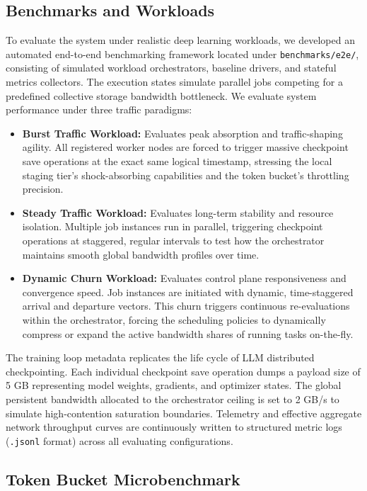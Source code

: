 \documentclass[sigplan,twocolumn,10pt,nonacm]{acmart}
\begin{document}
\subsection{Benchmarks and Workloads}

To evaluate the system under realistic deep learning workloads, we developed an automated end-to-end benchmarking framework located under \texttt{benchmarks/e2e/},
consisting of simulated workload orchestrators, baseline drivers, and stateful metrics collectors. The execution states simulate parallel jobs competing for a
predefined collective storage bandwidth bottleneck. We evaluate system performance under three traffic paradigms:

\begin{itemize}
    \item \textbf{Burst Traffic Workload:} Evaluates peak absorption and traffic-shaping agility. All registered worker nodes are forced to trigger massive checkpoint
    save operations at the exact same logical timestamp, stressing the local staging tier's shock-absorbing capabilities and the token bucket's throttling precision.
    \item \textbf{Steady Traffic Workload:} Evaluates long-term stability and resource isolation. Multiple job instances run in parallel, triggering checkpoint
    operations at staggered, regular intervals to test how the orchestrator maintains smooth global bandwidth profiles over time.
    \item \textbf{Dynamic Churn Workload:} Evaluates control plane responsiveness and convergence speed. Job instances are initiated with dynamic, time-staggered
    arrival and departure vectors. This churn triggers continuous re-evaluations within the orchestrator, forcing the scheduling policies to dynamically compress or
    expand the active bandwidth shares of running tasks on-the-fly.
\end{itemize}

The training loop metadata replicates the life cycle of LLM distributed checkpointing. Each individual checkpoint save operation dumps a payload
size of 5 GB representing model weights, gradients, and optimizer states. The global persistent bandwidth allocated to the orchestrator ceiling is set to 2 GB/s to
simulate high-contention saturation boundaries. Telemetry and effective aggregate network throughput curves are continuously written to structured metric logs
(\texttt{.jsonl} format) across all evaluating configurations.

\subsection{Token Bucket Microbenchmark}
\label{sec:token_bucket_benchmark}
\end{document}
